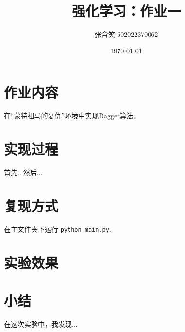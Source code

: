\documentclass[UTF8]{ctexart}
\begin{document}

\title{强化学习：作业一}

\author{张含笑 502022370062}

\date{\today}

\maketitle

\section{作业内容}
在“蒙特祖马的复仇”环境中实现Dagger算法。


\section{实现过程}

首先...然后...


\section{复现方式}
在主文件夹下运行 \texttt{python main.py}.


\section{实验效果}




\section{小结}
在这次实验中，我发现...



\end{document}
